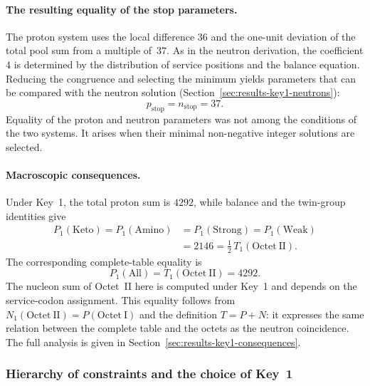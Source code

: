 \documentclass[11pt,a4paper]{article}
\renewcommand{\_}{\origunderscore\allowbreak}
\begin{document}
\paragraph{The resulting equality of the stop parameters.}
The proton system uses the local difference $36$ and the
one-unit deviation of the total pool sum from a multiple
of~$37$. As in the neutron derivation, the coefficient $4$
is determined by the distribution of service positions and
the balance equation. Reducing the congruence and selecting
the minimum yields parameters that can be compared with
the neutron solution (Section~\ref{sec:results-key1-neutrons}):
\[
p_{\text{stop}}=n_{\text{stop}}=37.
\]
Equality of the proton and neutron parameters was not among
the conditions of the two systems. It arises when their
minimal non-negative integer solutions are selected.

\paragraph{Macroscopic consequences.}
Under Key~1, the total proton sum is $4292$, while balance
and the twin-group identities give
\[
\begin{aligned}
P_1(\mathrm{Keto})=P_1(\mathrm{Amino})
&=P_1(\mathrm{Strong})=P_1(\mathrm{Weak})\\
&=2146=\tfrac12\,T_1(\mathrm{Octet~II}).
\end{aligned}
\]
The corresponding complete-table equality is
\[
P_1(\mathrm{All})=T_1(\mathrm{Octet~II})=4292.
\]
The nucleon sum of Octet~II here is computed under Key~1
and depends on the service-codon assignment. This equality
follows from $N_1(\mathrm{Octet~II})=P(\mathrm{Octet~I})$
and the definition $T=P+N$: it expresses the same relation
between the complete table and the octets as the neutron
coincidence. The full analysis is given in
Section~\ref{sec:results-key1-consequences}.

\subsubsection{Hierarchy of constraints and the choice of Key~1}
\label{sec:results-key1-uniqueness}
\end{document}
